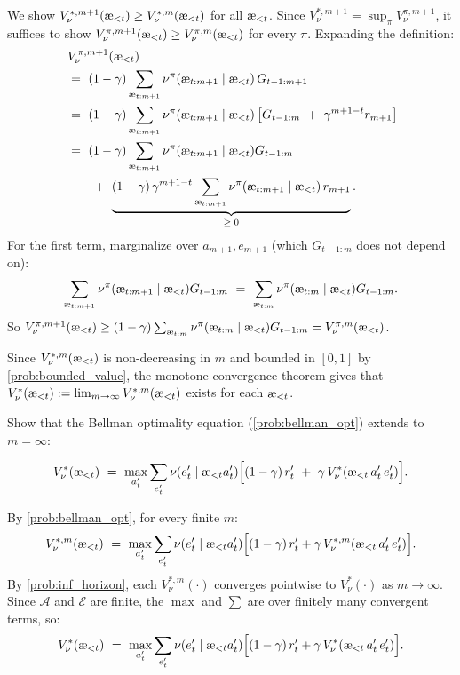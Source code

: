 \documentclass[fontsize=11pt, parskip=half]{scrartcl}
\newcommand{\cA}{\mathcal{A}}
\newcommand{\cE}{\mathcal{E}}
\newcommand{\aes}{\textnormal{\ae}}
\begin{document}
\begin{solution}
We show $V_\nu^{*,m+1}(\aes_{<t}) \geq V_\nu^{*,m}(\aes_{<t})$ for all $\aes_{<t}$.
Since $V_\nu^{*,m+1} = \sup_\pi V_\nu^{\pi,m+1}$, it suffices to show $V_\nu^{\pi,m+1}(\aes_{<t}) \geq V_\nu^{\pi,m}(\aes_{<t})$ for every $\pi$.
Expanding the definition:
\begin{align*}
    & V_\nu^{\pi,m+1}(\aes_{<t}) \\
    ~&=~ (1-\gamma) \sum_{\aes_{t:m+1}} \nu^\pi(\aes_{t:m+1} \mid \aes_{<t})\, G_{t-1:m+1} \\
    ~&=~ (1-\gamma) \sum_{\aes_{t:m+1}} \nu^\pi(\aes_{t:m+1} \mid \aes_{<t}) \left[G_{t-1:m} ~+~ \gamma^{m+1-t} r_{m+1}\right] \\
    ~&=~ (1-\gamma) \sum_{\aes_{t:m+1}} \nu^\pi(\aes_{t:m+1} \mid \aes_{<t}) G_{t-1:m} \\
    ~&\qquad+~ \underbrace{(1-\gamma)\, \gamma^{m+1-t} \sum_{\aes_{t:m+1}} \nu^\pi(\aes_{t:m+1} \mid \aes_{<t})\, r_{m+1}}_{\geq\; 0}.
\end{align*}
For the first term, marginalize over $a_{m+1}, e_{m+1}$ (which $G_{t-1:m}$ does not depend on):
\[
    \sum_{\aes_{t:m+1}} \nu^\pi(\aes_{t:m+1} \mid \aes_{<t}) G_{t-1:m}
    ~=~ \sum_{\aes_{t:m}} \nu^\pi(\aes_{t:m} \mid \aes_{<t}) G_{t-1:m}.
\]
So $V_\nu^{\pi,m+1}(\aes_{<t}) \geq (1-\gamma) \sum_{\aes_{t:m}} \nu^\pi(\aes_{t:m} \mid \aes_{<t}) G_{t-1:m} = V_\nu^{\pi,m}(\aes_{<t})$.

Since $V_\nu^{*,m}(\aes_{<t})$ is non-decreasing in $m$ and bounded in $[0,1]$ by \cref{prob:bounded_value}, the monotone convergence theorem gives that $V_\nu^*(\aes_{<t}) := \lim_{m \to \infty} V_\nu^{*,m}(\aes_{<t})$ exists for each $\aes_{<t}$.
\end{solution}

\begin{exercise}
\label{prob:inf_bellman_opt}
Show that the Bellman optimality equation (\cref{prob:bellman_opt}) extends to $m = \infty$:

\[
    V_\nu^*(\aes_{<t}) ~=~ \max_{a'_t} \sum_{e'_t} \nu(e'_t \mid \aes_{<t} a'_t) \Big[(1-\gamma)\, r'_t ~+~ \gamma\, V_\nu^*(\aes_{<t}\, a'_t\, e'_t)\Big].
\]

\end{exercise}

\begin{solution}
By \cref{prob:bellman_opt}, for every finite $m$:
\[
    V_\nu^{*,m}(\aes_{<t}) ~=~ \max_{a'_t} \sum_{e'_t} \nu(e'_t \mid \aes_{<t} a'_t) \Big[(1-\gamma)\, r'_t + \gamma\, V_\nu^{*,m}(\aes_{<t}\, a'_t\, e'_t)\Big].
\]
By \cref{prob:inf_horizon}, each $V_\nu^{*,m}(\cdot)$ converges pointwise to $V_\nu^*(\cdot)$ as $m \to \infty$.
Since $\cA$ and $\cE$ are finite, the $\max$ and $\sum$ are over finitely many convergent terms, so:
\[
    V_\nu^*(\aes_{<t}) ~=~ \max_{a'_t} \sum_{e'_t} \nu(e'_t \mid \aes_{<t} a'_t) \Big[(1-\gamma)\, r'_t + \gamma\, V_\nu^*(\aes_{<t}\, a'_t\, e'_t)\Big].
\]
\end{solution}
\end{document}

